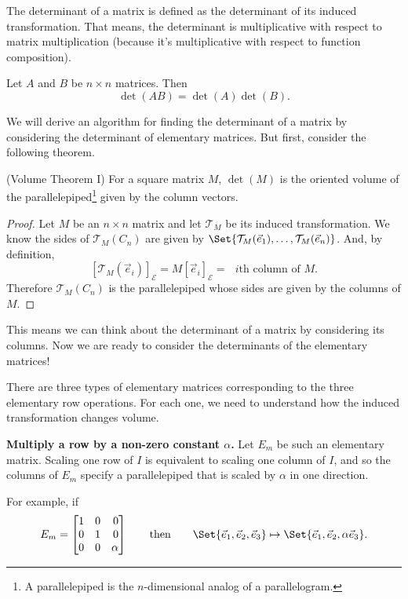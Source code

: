 
The determinant of a matrix is defined as the determinant of its induced transformation.
That means, the determinant is multiplicative with respect to matrix multiplication (because
it's multiplicative with respect to function composition).

\begin{theorem}
	Let $A$ and $B$ be $n\times n$ matrices. Then
	\[
		\det(AB)=\det(A)\det(B).
	\]
\end{theorem}

We will derive an algorithm for finding the determinant of a matrix by considering the determinant of
elementary matrices. But first, consider the following theorem.

\begin{theorem}(Volume Theorem I)
	For a square matrix $M$, $\det(M)$ is the oriented volume of the parallelepiped\footnote{ A parallelepiped is the
	$n$-dimensional analog of a parallelogram.} given by the column
	vectors.
\end{theorem}
\begin{proof}
	Let $M$ be an $n\times n$ matrix and let $\mathcal T_M$ be its induced transformation. We know the sides of
	$\mathcal T_{M}(C_n)$ are given by $\Set{\mathcal T_M(\vec e_1),\ldots,\mathcal T_M(\vec e_n)}$. And, by definition,
	\[
		[\mathcal T_M(\vec e_i)]_{\mathcal E} = M[\vec e_i]_{\mathcal E} = \text{ $i$th column of $M$.}
	\]
	Therefore $\mathcal T_{M}(C_n)$ is the parallelepiped whose sides are given by the columns of $M$.
\end{proof}

This means we can think about the determinant of a matrix by considering its columns. Now we are ready to consider
the determinants of the elementary matrices!

\bigskip
There are three types of elementary matrices corresponding to the three elementary row operations. For each
one, we need to understand how the induced transformation changes volume.

{\bfseries Multiply a row by a non-zero constant $\alpha$.} Let $E_m$ be such an elementary matrix. 
Scaling one row of $I$ is equivalent to scaling one column of $I$, and so the columns of $E_m$ specify a parallelepiped
that is scaled by $\alpha$ in one direction.

For example, if
\[
	E_m=\mat{1&0&0\\0&1&0\\0&0&\alpha}\qquad\text{then}\qquad \Set{\vec e_1,\vec e_2,\vec e_3}\mapsto\Set{\vec e_1,\vec e_2,\alpha\vec e_3}.
\]

